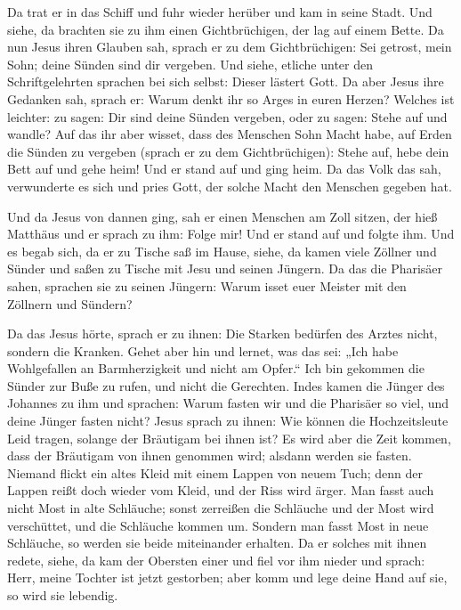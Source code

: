  Da trat er in das Schiff und fuhr wieder herüber und kam
in seine Stadt.  Und siehe, da brachten sie zu ihm einen
Gichtbrüchigen, der lag auf einem Bette. Da nun Jesus ihren Glauben sah,
sprach er zu dem Gichtbrüchigen: Sei getrost, mein Sohn; deine Sünden
sind dir vergeben.  Und siehe, etliche unter den
Schriftgelehrten sprachen bei sich selbst: Dieser lästert Gott.
 Da aber Jesus ihre Gedanken sah, sprach er: Warum denkt
ihr so Arges in euren Herzen?  Welches ist leichter: zu
sagen: Dir sind deine Sünden vergeben, oder zu sagen: Stehe auf und
wandle?  Auf das ihr aber wisset, dass des Menschen Sohn
Macht habe, auf Erden die Sünden zu vergeben (sprach er zu dem
Gichtbrüchigen): Stehe auf, hebe dein Bett auf und gehe heim!
 Und er stand auf und ging heim.  Da das
Volk das sah, verwunderte es sich und pries Gott, der solche Macht den
Menschen gegeben hat.

 Und da Jesus von dannen ging, sah er einen Menschen am
Zoll sitzen, der hieß Matthäus und er sprach zu ihm: Folge mir! Und er
stand auf und folgte ihm.  Und es begab sich, da er zu
Tische saß im Hause, siehe, da kamen viele Zöllner und Sünder und saßen
zu Tische mit Jesu und seinen Jüngern.  Da das die
Pharisäer sahen, sprachen sie zu seinen Jüngern: Warum isset euer
Meister mit den Zöllnern und Sündern?

 Da das Jesus hörte, sprach er zu ihnen: Die Starken
bedürfen des Arztes nicht, sondern die Kranken.  Gehet
aber hin und lernet, was das sei: „Ich habe Wohlgefallen an
Barmherzigkeit und nicht am Opfer.`` Ich bin gekommen die Sünder zur
Buße zu rufen, und nicht die Gerechten.  Indes kamen die
Jünger des Johannes zu ihm und sprachen: Warum fasten wir und die
Pharisäer so viel, und deine Jünger fasten nicht?  Jesus
sprach zu ihnen: Wie können die Hochzeitsleute Leid tragen, solange der
Bräutigam bei ihnen ist? Es wird aber die Zeit kommen, dass der
Bräutigam von ihnen genommen wird; alsdann werden sie fasten.
 Niemand flickt ein altes Kleid mit einem Lappen von
neuem Tuch; denn der Lappen reißt doch wieder vom Kleid, und der Riss
wird ärger.  Man fasst auch nicht Most in alte Schläuche;
sonst zerreißen die Schläuche und der Most wird verschüttet, und die
Schläuche kommen um. Sondern man fasst Most in neue Schläuche, so werden
sie beide miteinander erhalten.  Da er solches mit ihnen
redete, siehe, da kam der Obersten einer und fiel vor ihm nieder und
sprach: Herr, meine Tochter ist jetzt gestorben; aber komm und lege
deine Hand auf sie, so wird sie lebendig.

